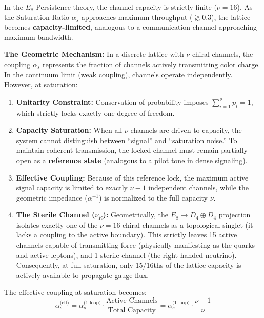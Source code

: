 In the $E_8$-Persistence theory, the channel capacity is strictly finite ($\nu=16$). As the Saturation Ratio $\alpha_s$ approaches maximum throughput ($\gtrsim 0.3$), the lattice becomes \textbf{capacity-limited}, analogous to a communication channel approaching maximum bandwidth.

\textbf{The Geometric Mechanism:}
In a discrete lattice with $\nu$ chiral channels, the coupling $\alpha_s$ represents the fraction of channels actively transmitting color charge. In the continuum limit (weak coupling), channels operate independently. However, at saturation:

\begin{enumerate}
    \item \textbf{Unitarity Constraint:} Conservation of probability imposes $\sum_{i=1}^{\nu} p_i = 1$, which strictly locks exactly one degree of freedom. 
    
    \item \textbf{Capacity Saturation:} When all $\nu$ channels are driven to capacity, the system cannot distinguish between ``signal'' and ``saturation noise.'' To maintain coherent transmission, the locked channel must remain partially open as a \textbf{reference state} (analogous to a pilot tone in dense signaling).
    
    \item \textbf{Effective Coupling:} Because of this reference lock, the maximum active signal capacity is limited to exactly $\nu-1$ independent channels, while the geometric impedance ($\alpha^{-1}$) is normalized to the full capacity $\nu$.

    \item \textbf{The Sterile Channel ($\nu_R$):} Geometrically, the $E_8 \to D_4 \oplus D_4$ projection isolates exactly one of the $\nu=16$ chiral channels as a topological singlet (it lacks a coupling to the active boundary). This strictly leaves 15 active channels capable of transmitting force (physically manifesting as the quarks and active leptons), and 1 sterile channel (the right-handed neutrino). Consequently, at full saturation, only 15/16ths of the lattice capacity is actively available to propagate gauge flux.
\end{enumerate}

The effective coupling at saturation becomes:
\begin{equation}
\alpha_s^{\text{(eff)}} = \alpha_s^{\text{(1-loop)}} \cdot \frac{\text{Active Channels}}{\text{Total Capacity}} 
= \alpha_s^{\text{(1-loop)}} \cdot \frac{\nu-1}{\nu}
\end{equation}

